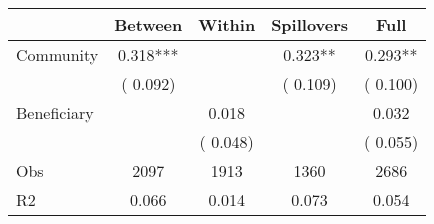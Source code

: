 
\begin{tabular}{l*{4}{c}}\hline&\multicolumn{1}{c}{Between}&\multicolumn{1}{c}{Within}&\multicolumn{1}{c}{Spillovers}&\multicolumn{1}{c}{Full}\\ \hline
 Community             &              0.318***      &                                               &        0.323** &         0.293**                            \\ 
                               &        (       0.092)           &                                       &       (       0.109)     &      (       0.100)                                           \\ 
 Beneficiary   &                                               &        0.018    &                                &             0.032                            \\ 
                               &                                               & (       0.048)                  &                                        &      (       0.055)                                           \\ 
\hline                                                                                                                                                                                                                                            
 Obs                   &               2097               &       1913                       &       1360                &              2686                                               \\ 
 R2                    &                      0.066              &              0.014                      &              0.073               &                     0.054                                              \\ 
\hline \end{tabular}                                                                                                                                                                                                              